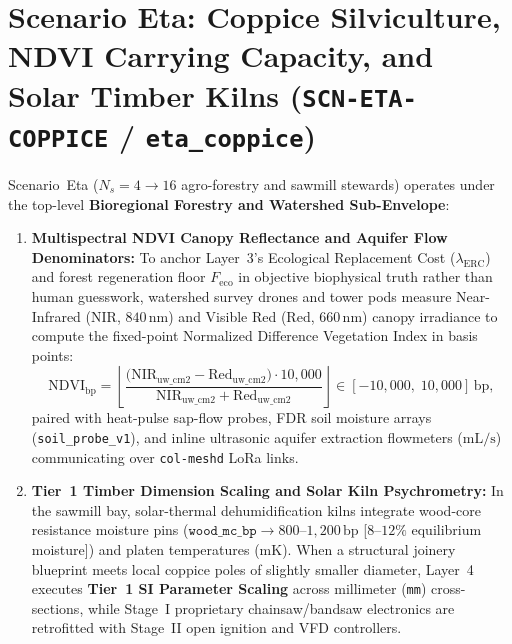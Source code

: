 \section{Scenario Eta: Coppice Silviculture, NDVI Carrying Capacity, and Solar Timber Kilns (\texttt{SCN-ETA-COPPICE} / \texttt{eta\_coppice})}
\label{sec:l2-wave-d-eta}

Scenario~Eta ($N_s = 4 \to 16$ agro-forestry and sawmill stewards) operates under the top-level \textbf{Bioregional Forestry and Watershed Sub-Envelope}:
\begin{enumerate}
    \item \textbf{Multispectral NDVI Canopy Reflectance and Aquifer Flow Denominators:} To anchor Layer~3's Ecological Replacement Cost ($\lambda_{\mathrm{ERC}}$) and forest regeneration floor $F_{\mathrm{eco}}$ in objective biophysical truth rather than human guesswork, watershed survey drones and tower pods measure Near-Infrared ($\mathrm{NIR}$, $840\,\mathrm{nm}$) and Visible Red ($\mathrm{Red}$, $660\,\mathrm{nm}$) canopy irradiance to compute the fixed-point Normalized Difference Vegetation Index in basis points:
    \begin{equation}
        \mathrm{NDVI}_{\mathrm{bp}} = \left\lfloor \frac{\bigl(\mathrm{NIR}_{\mathrm{uw\_cm2}} - \mathrm{Red}_{\mathrm{uw\_cm2}}\bigr) \cdot 10{,}000}{\mathrm{NIR}_{\mathrm{uw\_cm2}} + \mathrm{Red}_{\mathrm{uw\_cm2}}} \right\rfloor \in [-10{,}000,\; 10{,}000]\,\mathrm{bp},
        \label{eq:l2-ndvi-bp}
    \end{equation}
    paired with heat-pulse sap-flow probes, FDR soil moisture arrays (\texttt{soil\_probe\_v1}), and inline ultrasonic aquifer extraction flowmeters ($\mathrm{mL/s}$) communicating over \texttt{col-meshd} LoRa links.
    \item \textbf{Tier~1 Timber Dimension Scaling and Solar Kiln Psychrometry:} In the sawmill bay, solar-thermal dehumidification kilns integrate wood-core resistance moisture pins ($\mathtt{wood\_mc\_bp} \to 800\text{--}1{,}200\,\mathrm{bp}$ [$8\text{--}12\%$ equilibrium moisture]) and platen temperatures ($\mathrm{mK}$). When a structural joinery blueprint meets local coppice poles of slightly smaller diameter, Layer~4 executes \textbf{Tier~1 SI Parameter Scaling} across millimeter (\texttt{mm}) cross-sections, while Stage~I proprietary chainsaw/bandsaw electronics are retrofitted with Stage~II open ignition and VFD controllers.
\end{enumerate}

